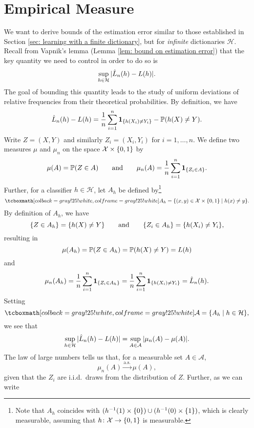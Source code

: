 \section{Empirical Measure}

We want to derive bounds of the estimation error similar to those established in Section \ref{sec: learning with a finite dictionary}, but for \emph{infinite} dictionaries $\mathcal{H}$. Recall from Vapnik's lemma (Lemma \ref{lem: bound on estimation error}) that the key quantity we need to control in order to do so is
\[
    \sup_{h \in \mathcal{H}} \abs*{\hat{L}_n(h) - L(h)}.
\]
The goal of bounding this quantity leads to the study of uniform deviations of relative frequencies from their theoretical probabilities. By definition, we have
\[
    \hat{L}_n(h) - L(h) = \frac{1}{n} \sum_{i=1}^n \indSet{h(X_i) \neq Y_i} - \P(h(X) \neq Y).
\]
Write $Z = (X, Y)$ and similarly $Z_i = (X_i, Y_i)$ for $i = 1, \dots, n$. We define two measures $\mu$ and $\mu_n$ on the space $\mathcal{X} \times \set{0, 1}$ by
\[
    \mu(A) = \P(Z \in A) \qquad \text{and} \qquad \mu_n(A) = \frac{1}{n} \sum_{i=1}^n \indSet{Z_i \in A}.
\]
Further, for a classifier $h \in \mathcal{H}$, let $A_h$ be defined by\footnote{Note that $A_h$ coincides with $(h^{-1}(1) \times \set{0}) \cup (h^{-1}(0) \times \set{1})$, which is clearly measurable, assuming that $h \colon \mathcal{X} \to \set{0, 1}$ is measurable.}
\begin{equation}
\label{eq: sets A_h}
    \highlightMath{
        A_h = \{(x, y) \in \mathcal{X} \times \set{0, 1} \with h(x) \neq y\}.
    }
\end{equation}
By definition of $A_h$, we have
\[
    \set{Z \in A_h} = \set{h(X) \neq Y} \qquad \text{and} \qquad \set{Z_i \in A_h} = \set{h(X_i) \neq Y_i},
\]
resulting in
\[
    \mu(A_h) = \P(Z \in A_h) = \P(h(X) \neq Y) = L(h)
\]
and
\[
    \mu_n(A_h) = \frac{1}{n} \sum_{i=1}^n \indSet{Z_i \in A_h} = \frac{1}{n} \sum_{i=1}^n \indSet{h(X_i) \neq Y_i} = \hat{L}_n(h).
\]
Setting
\begin{equation}
\label{eq: collection of sets A_h}
    \highlightMath{
        \mathcal{A} = \set{A_h \with h \in \mathcal{H}},
    }
\end{equation}
we see that
\[
    \sup_{h \in \mathcal{H}} \abs*{\hat{L}_n(h) - L(h)} = \sup_{A \in \mathcal{A}} \abs{\mu_n(A) - \mu(A)}.
\]
The law of large numbers tells us that, for a measurable set $A \in \mathcal{A}$,
\[
    \mu_n(A) \xrightarrow{\mathrm{a.s.}} \mu(A),
\]
given that the $Z_i$ are i.i.d.\ draws from the distribution of $Z$. Further, as we can write
